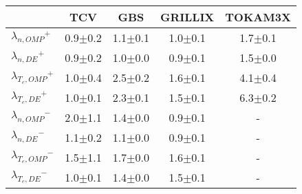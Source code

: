\begin{tabular}{lcccc}
\toprule
{} &          TCV &          GBS &      GRILLIX &      TOKAM3X \\
\midrule
$\lambda_{n,OMP}$$^{+}$   &  0.9$\pm$0.2 &  1.1$\pm$0.1 &  1.0$\pm$0.1 &  1.7$\pm$0.1 \\
$\lambda_{n,DE}$$^{+}$    &  0.9$\pm$0.2 &  1.0$\pm$0.0 &  0.9$\pm$0.1 &  1.5$\pm$0.0 \\
$\lambda_{T_e,OMP}$$^{+}$ &  1.0$\pm$0.4 &  2.5$\pm$0.2 &  1.6$\pm$0.1 &  4.1$\pm$0.4 \\
$\lambda_{T_e,DE}$$^{+}$  &  1.0$\pm$0.1 &  2.3$\pm$0.1 &  1.5$\pm$0.1 &  6.3$\pm$0.2 \\
$\lambda_{n,OMP}$$^{-}$   &  2.0$\pm$1.1 &  1.4$\pm$0.0 &  0.9$\pm$0.1 &            - \\
$\lambda_{n,DE}$$^{-}$    &  1.1$\pm$0.2 &  1.1$\pm$0.0 &  0.9$\pm$0.1 &            - \\
$\lambda_{T_e,OMP}$$^{-}$ &  1.5$\pm$1.1 &  1.7$\pm$0.0 &  1.6$\pm$0.1 &            - \\
$\lambda_{T_e,DE}$$^{-}$  &  1.0$\pm$0.1 &  1.4$\pm$0.0 &  1.5$\pm$0.1 &            - \\
\bottomrule
\end{tabular}
